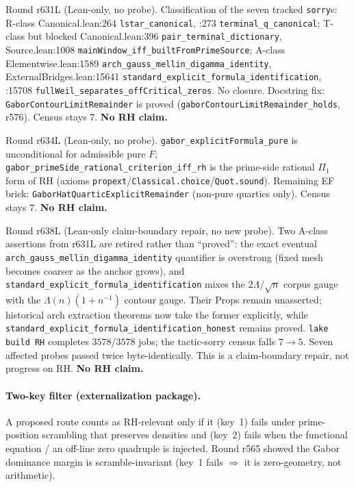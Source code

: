 \documentclass[11pt]{article}
\theoremstyle{definition}
\theoremstyle{remark}
\begin{document}
\noindent Round r631L (Lean-only, no probe).  Classification of
the seven tracked \texttt{sorry}s: R-class Canonical.lean:264
\texttt{lstar\_canonical}, :273 \texttt{terminal\_q\_canonical};
T-class but blocked Canonical.lean:396
\texttt{pair\_terminal\_dictionary}, Source.lean:1008
\texttt{mainWindow\_iff\_builtFromPrimeSource}; A-class
Elementwise.lean:1589 \texttt{arch\_gauss\_mellin\_digamma\_identity},
ExternalBridges.lean:15641
\texttt{standard\_explicit\_formula\_identification}, :15708
\texttt{fullWeil\_separates\_offCritical\_zeros}.  No closure.
Docstring fix: \texttt{GaborContourLimitRemainder} is proved
(\texttt{gaborContourLimitRemainder\_holds}, r576).  Census stays
$7$.  \textbf{No RH claim.}

\noindent Round r634L (Lean-only, no probe).
\texttt{gabor\_explicitFormula\_pure} is unconditional for
admissible pure $F$;
\texttt{gabor\_primeSide\_rational\_criterion\_iff\_rh} is the
prime-side rational $\Pi_1$ form of RH (axioms
\texttt{propext}/\texttt{Classical.choice}/\texttt{Quot.sound}).
Remaining EF brick: \texttt{GaborHatQuarticExplicitRemainder}
(non-pure quartics only).  Census stays $7$.
\textbf{No RH claim.}

\noindent Round r638L (Lean-only claim-boundary repair, no new
probe).  Two A-class assertions from r631L are retired rather than
``proved'': the exact eventual
\texttt{arch\_gauss\_mellin\_digamma\_identity} quantifier is
overstrong (fixed mesh becomes coarser as the anchor grows), and
\texttt{standard\_explicit\_formula\_identification} mixes the
$2\Lambda/\sqrt n$ corpus gauge with the
$\Lambda(n)(1+n^{-1})$ contour gauge.  Their Props remain unasserted;
historical arch extraction theorems now take the former explicitly,
while \texttt{standard\_explicit\_formula\_identification\_honest}
remains proved.  \texttt{lake build RH} completes $3578/3578$ jobs;
the tactic-sorry census falls $7\to5$.  Seven affected probes passed
twice byte-identically.  This is a claim-boundary repair, not progress
on RH.  \textbf{No RH claim.}

\paragraph{Two-key filter (externalization package).}
A proposed route counts as RH-relevant only if it (key~1) fails under
prime-position scrambling that preserves densities and (key~2) fails when
the functional equation / an off-line zero quadruple is injected.
Round r565 showed the Gabor dominance margin is scramble-invariant
(key~1 fails $\Rightarrow$ it is zero-geometry, not arithmetic).
\end{document}
